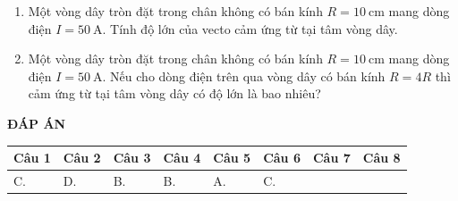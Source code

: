 \begin{enumerate}
{
	}
	\item {Một vòng dây tròn đặt trong chân không có bán kính $R = 10\ \text{cm}$ mang dòng điện $I = 50\ \text{A}$. Tính độ lớn của vecto cảm ứng từ tại tâm vòng dây.
	}
	\item {Một vòng dây tròn đặt trong chân không có bán kính $R = 10\ \text{cm}$ mang dòng điện $I = 50\ \text{A}$. Nếu cho dòng điện trên qua vòng dây có bán kính $R = 4R$ thì cảm ứng từ tại tâm vòng dây có độ lớn là bao nhiêu?
	}
\end{enumerate}

\textbf{ĐÁP ÁN}
\begin{longtable}[\textwidth]{|p{}|p{}|p{}|p{}|p{}|p{}|p{}|p{}|}
	\hline%
	\multicolumn{1}{|c}{\textbf{Câu 1}} & \multicolumn{1}{|c|}{\textbf{Câu 2}} & \multicolumn{1}{c|}{\textbf{Câu 3}} &
	\multicolumn{1}{c|}{\textbf{Câu 4}} &
	\multicolumn{1}{c|}{\textbf{Câu 5}} &
	\multicolumn{1}{c|}{\textbf{Câu 6}} &
	\multicolumn{1}{c|}{\textbf{Câu 7}} &
	\multicolumn{1}{c|}{\textbf{Câu 8}} \\
	\hline
	C.&D. &B. &B. &A. &C. & &\\
	\hline
	
\end{longtable}

